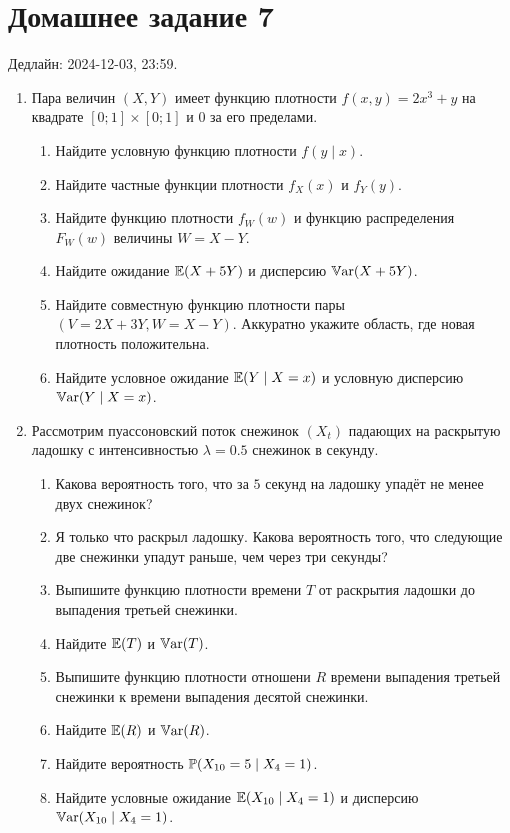 \section*{Домашнее задание 7}


Дедлайн: 2024-12-03, 23:59.

\begin{enumerate}

\item Пара величин $(X, Y)$ имеет функцию плотности $f(x, y) = 2x^3 + y$ на квадрате $[0;1] \times [0;1]$ и $0$ за его пределами. 
\begin{enumerate}
    \item Найдите условную функцию плотности $f(y \mid x)$.
    \item Найдите частные функции плотности $f_X(x)$ и $f_Y(y)$.
    \item Найдите функцию плотности $f_W(w)$ и функцию распределения $F_W(w)$ величины $W = X - Y$. 
    \item Найдите ожидание $\E(X + 5Y)$ и дисперсию $\Var(X + 5Y)$.
    \item Найдите совместную функцию плотности пары $(V = 2X + 3Y, W = X - Y)$. Аккуратно укажите область, где новая плотность положительна. 
    \item Найдите условное ожидание $\E(Y \mid X = x)$ и условную дисперсию $\Var(Y \mid X = x)$.
\end{enumerate}

\item Рассмотрим пуассоновский поток снежинок $(X_t)$ падающих на раскрытую ладошку с интенсивностью $\lambda = 0.5$ снежинок в секунду.
\begin{enumerate}
    \item Какова вероятность того, что за $5$ секунд на ладошку упадёт не менее двух снежинок?
    \item Я только что раскрыл ладошку. Какова вероятность того, что следующие две снежинки упадут раньше, чем через три секунды?
    \item Выпишите функцию плотности времени $T$ от раскрытия ладошки до выпадения третьей снежинки. 
    \item Найдите $\E(T)$ и $\Var(T)$.
    \item Выпишите функцию плотности отношени $R$ времени выпадения третьей снежинки к времени выпадения десятой снежинки. 
    \item Найдите $\E(R)$ и $\Var(R)$.
    \item Найдите вероятность $\P(X_{10} = 5 \mid X_{4} = 1)$.
    \item Найдите условные ожидание $\E(X_{10} \mid X_{4} = 1)$ и дисперсию $\Var(X_{10} \mid X_4 = 1)$.
\end{enumerate}


\end{enumerate}
